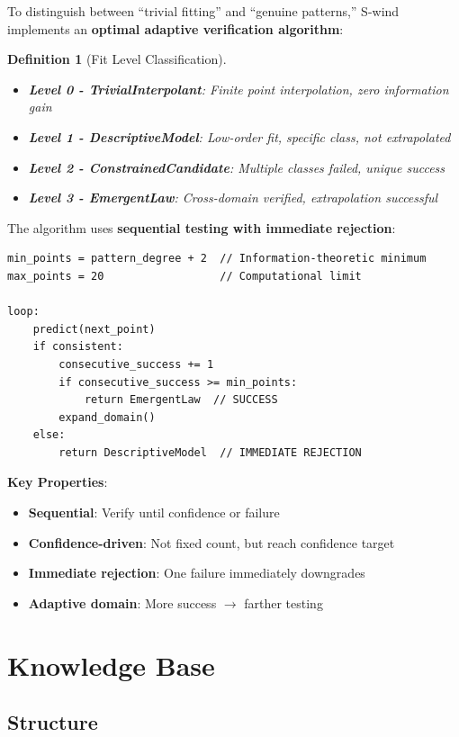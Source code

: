 \documentclass[11pt,a4paper]{article}
\newtheorem{definition}{Definition}
\begin{document}
To distinguish between ``trivial fitting'' and ``genuine patterns,'' S-wind implements an \textbf{optimal adaptive verification algorithm}:

\begin{definition}[Fit Level Classification]
\begin{itemize}
    \item \textbf{Level 0 - TrivialInterpolant}: Finite point interpolation, zero information gain
    \item \textbf{Level 1 - DescriptiveModel}: Low-order fit, specific class, not extrapolated
    \item \textbf{Level 2 - ConstrainedCandidate}: Multiple classes failed, unique success
    \item \textbf{Level 3 - EmergentLaw}: Cross-domain verified, extrapolation successful
\end{itemize}
\end{definition}

The algorithm uses \textbf{sequential testing with immediate rejection}:

\begin{verbatim}
min_points = pattern_degree + 2  // Information-theoretic minimum
max_points = 20                  // Computational limit

loop:
    predict(next_point)
    if consistent:
        consecutive_success += 1
        if consecutive_success >= min_points:
            return EmergentLaw  // SUCCESS
        expand_domain()
    else:
        return DescriptiveModel  // IMMEDIATE REJECTION
\end{verbatim}

\textbf{Key Properties}:
\begin{itemize}
    \item \textbf{Sequential}: Verify until confidence or failure
    \item \textbf{Confidence-driven}: Not fixed count, but reach confidence target
    \item \textbf{Immediate rejection}: One failure immediately downgrades
    \item \textbf{Adaptive domain}: More success $\rightarrow$ farther testing
\end{itemize}

\section{Knowledge Base}

\subsection{Structure}
\end{document}
